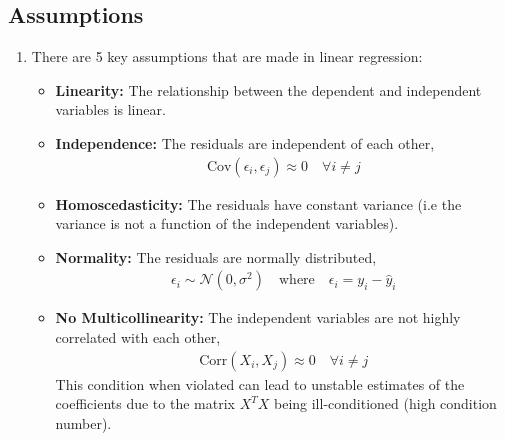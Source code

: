 \documentclass[letterpaper, 11pt]{article}
\newcommand{\normal}[2]{\mathcal{N}\left(#1,#2\right)}
\newcommand{\1}{\mathds{1}}	%
\theoremstyle{definition}
\begin{document}
\subsection{Assumptions}
\begin{enumerate}
    \item There are 5 key assumptions that are made in linear regression:
    \begin{itemize}
        \item \textbf{Linearity:} The relationship between the dependent and independent variables is linear.
        \item \textbf{Independence:} The residuals are independent of each other,
        \begin{align}
            \text{Cov}(\epsilon_i, \epsilon_j) \approx 0 \quad \forall i \neq j
        \end{align}
        \item \textbf{Homoscedasticity:} The residuals have constant variance (i.e the variance is not a function of the independent variables).
        \item \textbf{Normality:} The residuals are normally distributed,
        \begin{align}
            \epsilon_i \sim \normal{0}{\sigma^2} \quad \text{where} \quad \epsilon_i = y_i - \hat{y}_i
        \end{align}
        \item \textbf{No Multicollinearity:} The independent variables are not highly correlated with each other,
        \begin{align}
            \text{Corr}(X_i, X_j) \approx 0 \quad \forall i \neq j
        \end{align}
        This condition when violated can lead to unstable estimates of the coefficients due to 
        the matrix $X^T X$ being ill-conditioned (high condition number).
    \end{itemize}
\end{enumerate}
\end{document}
